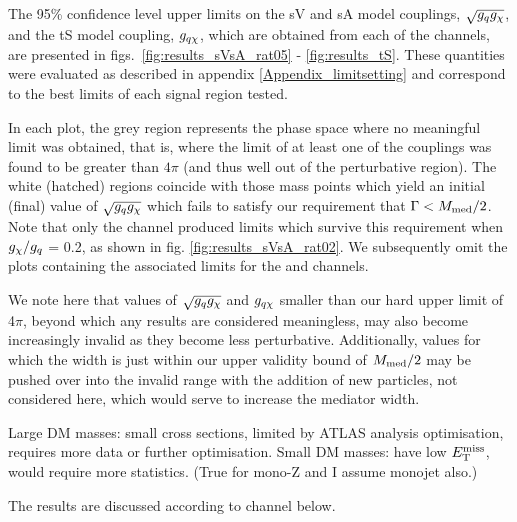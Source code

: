 The 95\% confidence level upper limits on the sV and sA model couplings, $\sqrt{g_q g_{\chi}}$, and the tS model coupling, $g_{q \chi}$, which are obtained from each of the \monoX channels, are presented in figs.~\ref{fig:results_sVsA_rat05} - \ref{fig:results_tS}. These quantities were evaluated as described in appendix \ref{Appendix_limitsetting} and correspond to the best limits of each signal region tested.

In each plot, the grey region represents the phase space where no meaningful limit was obtained, that is, where the limit of at least one of the couplings was found to be greater than $4\pi$ (and thus well out of the perturbative region). The white (hatched) regions coincide with those mass points which yield an initial (final) value of $\sqrt{g_q g_{\chi}}$ which fails to satisfy our requirement that $\Gamma < M_{\mathrm{med}} / 2$. Note that only the \monojet channel produced limits which survive this requirement when $g_{\chi} / g_q$ = 0.2, as shown in fig. \ref{fig:results_sVsA_rat02}. We subsequently omit the plots containing the associated limits for the \monoZ and \monoWZ channels.

We note here that values of $\sqrt{g_q g_{\chi}}$ and $g_{q \chi}$ smaller than our hard upper limit of 4$\pi$, beyond which any results are considered meaningless, may also become increasingly invalid as they become less perturbative. Additionally, values for which the width is just within our upper validity bound of $M_{\mathrm{med}}/2$ may be pushed over into the invalid range with the addition of new particles, not considered here, which would serve to increase the mediator width.

Large DM masses: small cross sections, limited by ATLAS analysis optimisation, requires more data or further optimisation. Small DM masses: have low $E_{\mathrm{T}}^{\mathrm{miss}}$, would require more statistics. (True for mono-Z and I assume monojet also.)

The results are discussed according to channel below.

